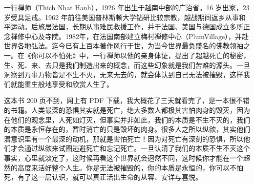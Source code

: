 \begin{book}
    一行禅师（Thich Nhat Hanh），1926 年出生于越南中部的广治省。16 岁出家，23 岁受具足戒。1962 年前往美国普林斯顿大学钻研比较宗教，越战期间返乡从事和平运动。后旅居法国，长期从事难民救援工作，并于法国、美国与德国成立多所正念禅修中心及寺院。1982年，在法国南部建立梅村禅修中心（PlumVillage），并赴世界各地弘法。迄今已有上百本著作风行于世，为当今世界最负盛名的佛教领袖之一。在《你可以不怕死》中，一行禅师以他的亲身体证，提出了超越死亡的秘密，生、死、来、去只是我们制造出来的概念，而这些幻象就是我们苦难的源头。一旦洞察到万事万物皆是不生不灭，无来无去的，就会体认到自己无法被摧毁，这样我们就能重生般地享受和欣赏人生了。

    这本书 200 页不到，网上有 PDF 下载，我大概花了三天就看完了，是一本很不错的书籍。人类最深的恐惧其实就是死亡，绝大多数人都极其害怕肉身的毁灭，因为在他们的观念里，人死如灯灭，但事实并非如此，我们的本质是不生不灭的，我们的本质是永恒存在的，暂时消亡的只是毁坏的肉身。很多人之所以纵欲，其实他们潜意识里有一个最深的动机，那就是害怕死亡！因为对死亡有深刻的恐惧，所以他们才会通过纵欲来试图逃避死亡和忘记死亡。一旦认清了我们的本质不生不灭这个事实，心里就淡定了，这时候再看这个世界就会迥然不同，这时候你才能在一个超然的高度来活好整个人生。你是无法被摧毁的，你的本质是永恒的，你可以不怕死，有了这一层认识，就可以真正活出生命的从容、安详与喜悦。
\end{book}
